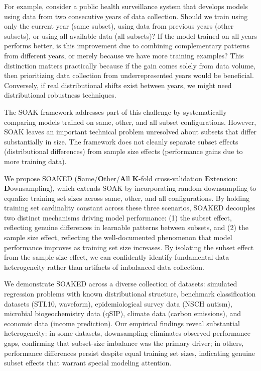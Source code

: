 \documentclass{article}
\begin{document}
For example, consider a public health surveillance system that develops models using data from two consecutive years of data collection. 
Should we train using only the current year (same subset), using data from previous years (other subsets), or using all available data (all subsets)? 
If the model trained on all years performs better, is this improvement due to combining complementary patterns from different years, or merely because we have more training examples? 
This distinction matters practically because if the gain comes solely from data volume, then prioritizing data collection from underrepresented years would be beneficial. 
Conversely, if real distributional shifts exist between years, we might need distributional robustness techniques.

The SOAK framework \citep{hocking2026} addresses part of this challenge by systematically comparing models trained on same, other, and all subset configurations.
However, SOAK leaves an important technical problem unresolved about subsets that differ substantially in size.
The framework does not cleanly separate subset effects (distributional differences) from sample size effects (performance gains due to more training data).

We propose SOAKED (\textbf{S}ame/\textbf{O}ther/\textbf{A}ll \textbf{K}-fold cross-validation \textbf{E}xtension: \textbf{D}ownsampling), which extends SOAK by incorporating random downsampling to equalize training set sizes across same, other, and all configurations. 
By holding training set cardinality constant across these three scenarios, SOAKED decouples two distinct mechanisms driving model performance: (1) the subset effect, reflecting genuine differences in learnable patterns between subsets, and (2) the sample size effect, reflecting the well-documented phenomenon that model performance improves as training set size increases. 
By isolating the subset effect from the sample size effect, we can confidently identify fundamental data heterogeneity rather than artifacts of imbalanced data collection.

We demonstrate SOAKED across a diverse collection of datasets: simulated regression problems with known distributional structure, benchmark classification datasets (STL10, waveform), epidemiological survey data (NSCH autism), microbial biogeochemistry data (qSIP), climate data (carbon emissions), and economic data (income prediction).
Our empirical findings reveal substantial heterogeneity: in some datasets, downsampling eliminates observed performance gaps, confirming that subset-size imbalance was the primary driver; in others, performance differences persist despite equal training set sizes, indicating genuine subset effects that warrant special modeling attention.
\end{document}
